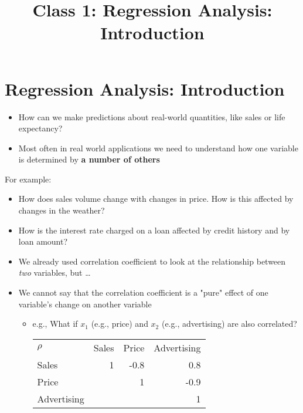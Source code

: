 \documentclass[10pt,article]{article}
\date{\vspace{-6ex}}
\title{Class 1: Regression Analysis: Introduction}
\begin{document}
\maketitle
{} 
\thispagestyle{fancy}

\setcounter{tocdepth}{1}
\tableofcontents
\vspace{6ex}

\section{Regression Analysis: Introduction}
\label{sec:orga7bb3be}
\begin{itemize}
\item How can we make predictions about real-world quantities, like sales or life
expectancy?
\item Most often in real world applications we need to understand how one variable
is determined by \textbf{a number of others}
\end{itemize}

For example:

\begin{itemize}
\item How does sales volume change with changes in price. How is this affected by
changes in the weather?
\item How is the interest rate charged on a loan affected by credit history and by
loan amount?
\end{itemize}

\begin{itemize}
\item We already used correlation coefficient to look at the relationship between 
\emph{two} variables, but \ldots{}
\item We cannot say that the correlation coefficient is a "pure" effect of
one variable's change on another variable

\begin{itemize}
\item e.g., What if \(x_{1}\) (e.g., price) and \(x_{2}\) (e.g., advertising) are also correlated?

\begin{center}
\begin{tabular}{lrrr}
\(\rho\) & Sales & Price & Advertising\\
Sales & 1 & -0.8 & 0.8\\
Price &  & 1 & -0.9\\
Advertising &  &  & 1\\
\end{tabular}
\end{center}
\end{itemize}
\end{itemize}
\end{document}
